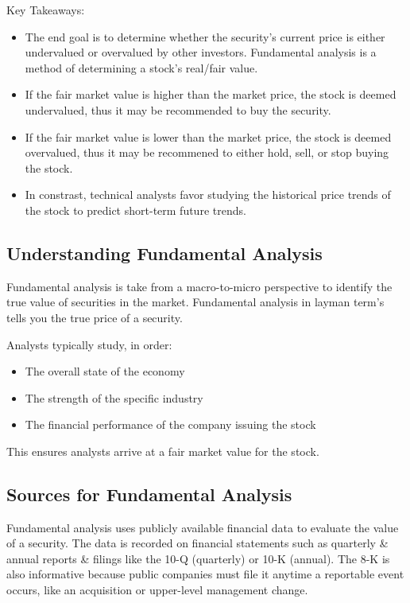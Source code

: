 \documentclass{article}
\begin{document}
	Key Takeaways:
	\begin{itemize}
		\item The end goal is to determine whether the security's current price is either undervalued or overvalued by other investors. Fundamental analysis is a method of determining a stock's real/fair value.
		\item If the fair market value is higher than the market price, the stock is deemed undervalued, thus it may be recommended to buy the security.
		\item If the fair market value is lower than the market price, the stock is deemed overvalued, thus it may be recommened to either hold, sell, or stop buying the stock.
		\item In constrast, technical analysts favor studying the historical price trends of the stock to predict short-term future trends.
	\end{itemize}
	
	\subsection{Understanding Fundamental Analysis}
	Fundamental analysis is take from a macro-to-micro perspective to identify the true value of securities in the market. Fundamental analysis in layman term's tells you the true
	price of a security. \newline

	Analysts typically study, in order:
	\begin{itemize}
		\item The overall state of the economy
		\item The strength of the specific industry
		\item The financial performance of the company issuing the stock
	\end{itemize}

	This ensures analysts arrive at a fair market value for the stock.

	\subsection{Sources for Fundamental Analysis}

	Fundamental analysis uses publicly available financial data to evaluate the value of a security. The data is recorded on financial statements such as quarterly \&
	annual reports \& filings like the 10-Q (quarterly) or 10-K (annual). The 8-K is also informative because public companies must file it anytime a reportable event occurs, like an 
	acquisition or upper-level management change.	\newline
	
\end{document}
